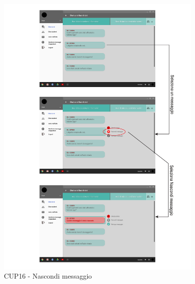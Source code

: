 \begin{figure}
	\centering
	\includegraphics[width=0.9\textwidth]{imgs/gruppo6/activities/act_cup16_nascondi_messaggio.pdf}
	\caption{CUP16 - Nascondi messaggio}
	\label{fig:cup16}
\end{figure}

